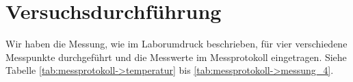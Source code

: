 \section{Versuchsdurchführung}
\label{sec:durchfuehrung}
Wir haben die Messung, wie im Laborumdruck beschrieben, für vier verschiedene Messpunkte durchgeführt und die Messwerte im Messprotokoll eingetragen. Siehe Tabelle \ref{tab:messprotokoll->temperatur} bis \ref{tab:messprotokoll->messung_4}.